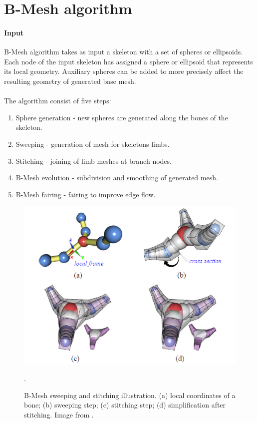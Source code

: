 \section{B-Mesh algorithm}
\paragraph{Input}
B-Mesh algorithm takes as input a skeleton with a set of spheres or ellipsoids. Each node of the input skeleton has assigned a sphere or ellipsoid that represents its local geometry. Auxiliary spheres can be added to more precisely affect the resulting geometry of generated base mesh.
\paragraph{}
The algorithm consist of five steps:
\begin{enumerate}
	\itemsep-0.25em 
	\item Sphere generation - new spheres are generated along the bones of the skeleton.
	\item Sweeping - generation of mesh for skeletons limbs.
	\item Stitching - joining of limb meshes at branch nodes.
	\item B-Mesh evolution - subdivision and smoothing of generated mesh.
	\item B-Mesh fairing - fairing to improve edge flow.
\end{enumerate}
\begin{figure}[h]
    \centering
    \includegraphics{images/b_mesh_ilu.png}
    \caption[B-Mesh sweeping and stitching illustration]{B-Mesh sweeping and stitching illustration. (a) local coordinates of a bone; (b) sweeping step; (c) stitching step; (d) simplification after stitching. Image from \cite{ji_bm}.}.
    \label{fig:b_mesh_stitch}
\end{figure}

